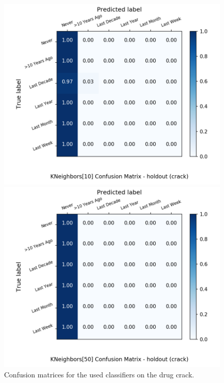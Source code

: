 \begin{figure}[H]
\begin{minipage}[b]{0.32\textwidth}
		\includegraphics[width=1.1\textwidth]{Plots/crack_KNeighbors_10_balance_False_holdout.png}
  \end{minipage}
	\begin{minipage}[b]{0.32\textwidth}
		\includegraphics[width=1.1\textwidth]{Plots/crack_KNeighbors_50_balance_False_holdout.png}
  \end{minipage}
	\caption{Confusion matrices for the used classifiers on the drug crack.}
\end{figure}


